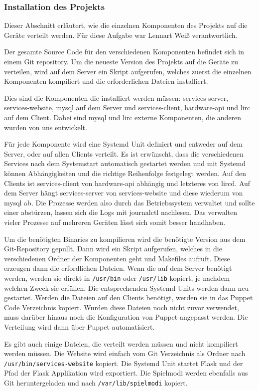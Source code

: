 \subsubsection{Installation des Projekts}

Dieser Abschnitt erläutert, wie die einzelnen Komponenten des Projekts auf die Geräte verteilt
werden.
Für diese Aufgabe war Lennart Weiß verantwortlich.

Der gesamte Source Code für den verschiedenen Komponenten befindet sich in einem Git repository.
Um die neueste Version des Projekts auf die Geräte zu verteilen, wird auf dem Server ein Skript
aufgerufen, welches zuerst die einzelnen Komponenten kompiliert und die erforderlichen Dateien
installiert.

Dies sind die Komponenten die installiert werden müssen: services-server, services-website, mysql
auf dem Server und services-client, hardware-api und lirc auf dem Client.
Dabei sind mysql und lirc externe Komponenten, die anderen wurden von uns entwickelt.

Für jede Komponente wird eine Systemd Unit definiert und entweder auf dem Server, oder auf allen
Clients verteilt.
Es ist erwünscht, dass die verschiedenen Services nach dem Systemstart automatisch gestartet werden
und mit Systemd können Abhängigkeiten und die richtige Reihenfolge festgelegt werden.
Auf den Clients ist services-client von hardware-api abhängig und letzteres von lircd.
Auf dem Server hängt services-server von services-website und diese wiederum von mysql ab.
Die Prozesse werden also durch das Betriebssystem verwaltet und sollte einer abstürzen, lassen sich
die Logs mit journalctl nachlesen.
Das verwalten vieler Prozesse auf mehreren Geräten lässt sich somit besser handhaben.

Um die benötigten Binaries zu kompilieren wird die benötigte Version aus dem Git-Repository gepullt.
Dann wird ein Skript aufgerufen, welches in die verschiedenen Ordner der Komponenten geht und
Makefiles aufruft.
Diese erzeugen dann die erfordlichen Dateien.
Wenn die auf dem Server benötigt werden, werden sie direkt in \texttt{/usr/bin} oder
\texttt{/usr/lib} kopiert, je nachdem welchen Zweck sie erfüllen.
Die entsprechenden Systemd Units werden dann neu gestartet.
Werden die Dateien auf den Clients benötigt, werden sie in das Puppet Code Verzeichnis kopiert.
Wurden diese Dateien noch nicht zuvor verwendet, muss darüber hinaus noch die Konfiguration von
Puppet angepasst werden.
Die Verteilung wird dann über Puppet automatisiert.

Es gibt auch einige Dateien, die verteilt werden müssen und nicht kompiliert werden müssen.
Die Website wird einfach vom Git Verzeichnis als Ordner nach \texttt{/usr/bin/services-website}
kopiert.
Die Systemd Unit startet Flask und der Pfad der Flask Applikation wird exportiert.
Die Spielmodi werden ebenfalls aus Git heruntergeladen und nach \texttt{/var/lib/spielmodi} kopiert.
